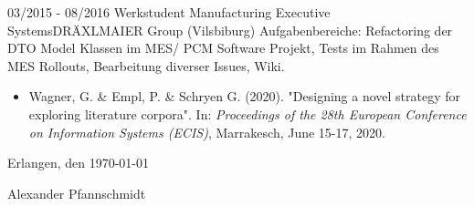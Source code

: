 \cvevent
{03/2015 - 08/2016}
{Werkstudent}
{Manufacturing Executive Systems\newline DRÄXLMAIER Group (Vilsbiburg)}
{Aufgabenbereiche: Refactoring der DTO Model Klassen im MES/ PCM Software Projekt, Tests im Rahmen des MES Rollouts, Bearbeitung diverser Issues, Wiki.}
\vfill\null


\begin{itemize}[leftmargin=*]
	\item Wagner, G. \& Empl, P. \&  Schryen G. (2020). "Designing a novel strategy for exploring literature corpora". In: \textit{Proceedings of the 28th European Conference on Information Systems (ECIS)}, Marrakesch, June 15-17, 2020.
\end{itemize}
\mbox{}
\vfill
\mbox{}
\vfill
\mbox{}
\vfill
\mbox{}
\vfill
\mbox{}


Erlangen, den \today     \hspace{1cm}   \hrulefill

\hspace*{30mm}\phantom{Erlangen, den \today }Alexander Pfannschmidt
